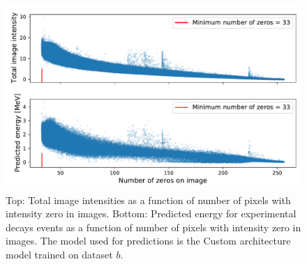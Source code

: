 \begin{figure}
\centering
\includegraphics[width=\textwidth]{chapters/results/figures/tot_intensity_predicted_energy_vs_zeros.pdf}
    \caption{\label{fig:regression-energy-intensity-prediction-energy-zeros} 
    Top: Total image intensities as a function of number of pixels with 
    intensity zero in images. Bottom: Predicted energy for experimental
    decays events as a function of number of pixels with intensity zero 
    in images. The model used for predictions is the Custom architecture model
    trained on dataset $b$.}
\end{figure}
